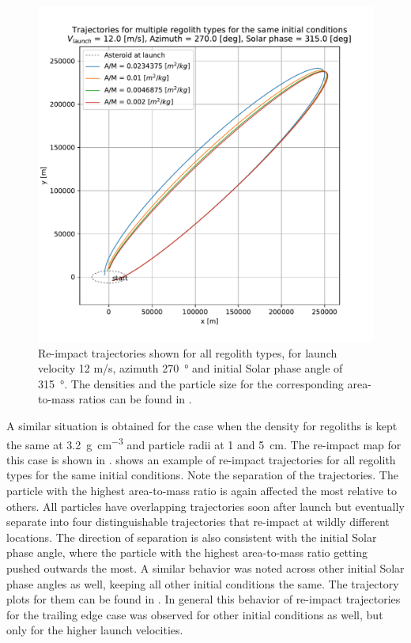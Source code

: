 \begin{figure}[htb]
\centering
\captionsetup{justification=centering}
\includegraphics[width=\textwidth, height=0.5\textheight, keepaspectratio=true]{trailing_edge_perturbations/reimpact_traj_12ms_270Azim_315solarPhase.pdf}
\caption{Re-impact trajectories shown for all regolith types, for launch velocity 12 m/s, azimuth \SI{270}{\degree} and initial Solar phase angle of \SI{315}{\degree}. The densities and the particle size for the corresponding area-to-mass ratios can be found in .}
\label{fig:trailingEdge_reimpact_traj_12ms_270azim_315solar}
\end{figure}
\FloatBarrier
A similar situation is obtained for the case when the density for regoliths is kept the same at \SI{3.2}{\gram\per\centi\metre\cubed} and particle radii at 1 and \SI{5}{\centi\metre}. The re-impact map for this case is shown in .  shows an example of re-impact trajectories for all regolith types for the same initial conditions. Note the separation of the trajectories. The particle with the highest area-to-mass ratio is again affected the most relative to others. All particles have overlapping trajectories soon after launch but eventually separate into four distinguishable trajectories that re-impact at wildly different locations. The direction of separation is also consistent with the initial Solar phase angle, where the particle with the highest area-to-mass ratio getting pushed outwards the most. A similar behavior was noted across other initial Solar phase angles as well, keeping all other initial conditions the same. The trajectory plots for them can be found in . In general this behavior of re-impact trajectories for the trailing edge case was observed for other initial conditions as well, but only for the higher launch velocities.

